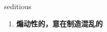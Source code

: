 
\begin{frame}
{\huge seditious}
\begin{center}
\begin{enumerate}\Large
  \item \textbf{煽动性的，意在制造混乱的}
\end{enumerate}
\end{center}
\end{frame}
